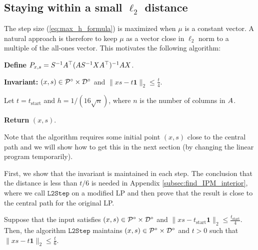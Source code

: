 \subsection{Staying within a small $\ell_{2}$ distance}

The step size (\ref{eq:max_h_formula}) is maximized when $\mu$ is
a constant vector. A natural approach is therefore to keep $\mu$
as a vector close in $\ell_{2}$ norm to a multiple of the all-ones
vector. This motivates the following algorithm:

\begin{algorithm2e}[H]

\caption{$\mathtt{L2Step}(\ma,x,s,t_{\mathrm{start}},t_{\mathrm{end}})$}

\label{alg:L2Step}

\textbf{Define} $P_{x,s}=S^{-1}A^{\top}(AS^{-1}XA^{\top})^{-1}AX$.

\textbf{Invariant:} $(x,s)\in\mathcal{P}^{\circ}\times\mathcal{D}^{\circ}$ and
$\|xs-t\mathbf{1}\|_{2}\leq\frac{t}{4}$. 

Let $t=t_{\mathrm{start}}$ and $h=1/(16\sqrt{n})$, where $n$ is
the number of columns in $A$.


\textbf{Return} $(x,s)$.

\end{algorithm2e}

Note that the algorithm requires some initial point $(x,s)$ close
to the central path and we will show how to get this in the next section
(by changing the linear program temporarily).

First, we show that the invariant is maintained in each step. The
conclusion that the distance is less than $t/6$ is needed in Appendix
\ref{subsec:find_IPM_interior}, where we call $\mathtt{L2Step}$
on a modified LP and then prove that the result is close to the central
path for the original LP.
\begin{lem}
\label{lem:L2Step}Suppose that the input satisfies $(x,s)\in\mathcal{P}^{\circ}\times\mathcal{D}^{\circ}$
and $\|xs-t_{\mathrm{start}}\mathbf{1}\|_{2}\leq\frac{t_{\mathrm{start}}}{4}$.
Then, the algorithm $\mathtt{L2Step}$ maintains $(x,s)\in\mathcal{P}^{\circ}\times\mathcal{D}^{\circ}$
and $t>0$ such that $\|xs-t\mathbf{1}\|_{2}\leq\frac{t}{6}$.
\end{lem}

